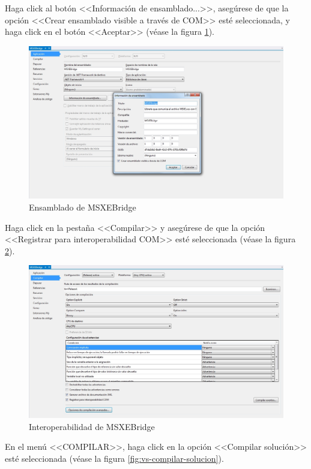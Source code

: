 \newpage

Haga click al bot\'{o}n <<Informaci\'{o}n de ensamblado...>>, aseg\'{u}rese de que la opci\'{o}n <<Crear ensamblado visible a trav\'{e}s de COM>> est\'{e} seleccionada, y haga click en el bot\'{o}n <<Aceptar>> (v\'{e}ase la figura \ref{fig:vs-ensamblado}).

\begin{figure}[H]
  \centering
  \includegraphics[width=.75\linewidth]{./img/vs-ensamblado.jpg}
\caption[]{Ensamblado de MSXEBridge\label{fig:vs-ensamblado}}
\end{figure}

Haga click en la pesta\~{n}a <<Compilar>> y aseg\'{u}rese de que la opci\'{o}n <<Registrar para interoperabilidad COM>> est\'{e} seleccionada (v\'{e}ase la figura \ref{fig:vs-compilar}).

\begin{figure}[H]
  \centering
  \includegraphics[width=.75\linewidth]{./img/vs-compilar.jpg}
\caption[]{Interoperabilidad de MSXEBridge\label{fig:vs-compilar}}
\end{figure}

\newpage

En el men\'{u} <<COMPILAR>>, haga click en la opci\'{o}n <<Compilar soluci\'{o}n>> est\'{e} seleccionada (v\'{e}ase la figura \ref{fig:vs-compilar-solucion}).

